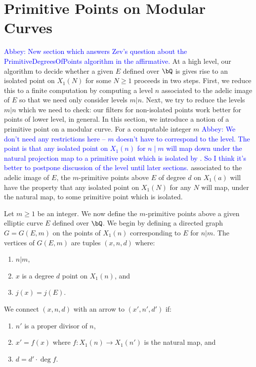 \documentclass[11pt,reqno]{amsart}
\theoremstyle{plain}
\theoremstyle{definition}
\newcommand{\Q}{\bQ}
\newcommand{\abbey}[1]{\textcolor{blue}{Abbey: #1}}
\newcommand{\abedit}[1]{{\color{blue} #1}}
\begin{document}
\section{Primitive Points on Modular Curves}
\abbey{New section which answers Zev's question about the PrimitiveDegreesOfPoints algorithm in the affirmative.}
At a high level, our algorithm to decide whether a given $E$ defined over $\Q$ is \abedit{gives rise to} an isolated point on $X_1(N)$ for some $N\geq 1$ proceeds in two steps. First, we reduce this to a finite computation by computing a level $n$ associated to the adelic image of $E$ so that we need only consider levels $m|n$. Next, we try to reduce the  levels $m|n$ which we need to check: our filters for non-isolated points work better for points of lower level, in general. In this section, we introduce a notion of a primitive point on a modular curve. 
For a computable integer $m$ \abbey{We don't need any restrictions here -- $m$ doesn't have to correspond to the level. The point is that any isolated point on $X_1(n)$ for $n \mid m$ will map down under the natural projection map to a primitive point which is isolated by \cite[Theorem 4.3]{BELOV}. So I think it's better to postpone discussion of the level until later sections.} associated to the adelic image of $E$, the $m$-primitive points above $E$ of degree $d$ on $X_1(a)$ will have the property that any isolated point on $X_1(N)$ for any $N$ will map, under the natural map, to some primitive  point \abedit{which is isolated}. 

Let $m\geq 1$ be an integer. We now define the $m$-primitive points above a given elliptic curve $E$ defined over $\Q$. We begin by defining a directed graph $G=G(E,m)$ on the points of $X_1(n)$ \abedit{corresponding to $E$} for $n|m$. The vertices of $G(E,m)$ are tuples $(x,n,d)$ where:
\begin{enumerate}
    \item $n|m$,
    \item $x$ is a degree $d$ point on $X_1(n)$, and 
    \item $j(x)=j(E)$.
\end{enumerate}
We connect $(x,n,d)$ with an arrow to $(x',n',d')$ if: 
\begin{enumerate}
    \item $n'$ is a proper divisor of $n$,
    \item $x'=f(x)$ where $f\colon X_1(n)\to X_1(n')$ is the natural map, and
    \item $d=d'\cdot \deg f$.
\end{enumerate}
\end{document}
